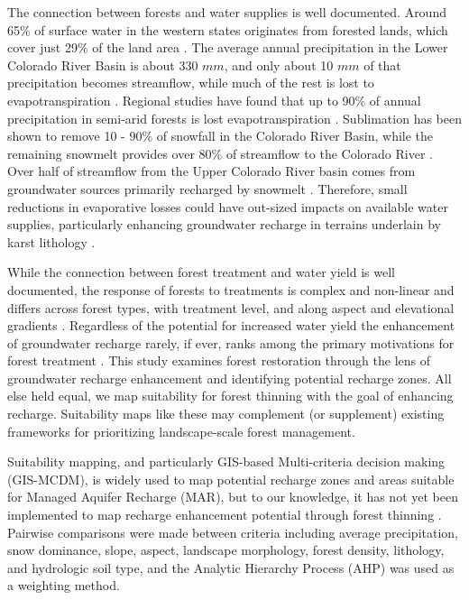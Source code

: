 \documentclass[
  number]{elsarticle}
\begin{document}
The connection between forests and water supplies is well documented.
Around 65\% of surface water in the western states originates from
forested lands, which cover just 29\% of the land area
\citep{brown_source_2005}. The average annual precipitation in the Lower
Colorado River Basin is about 330 \(mm\), and only about 10 \(mm\) of
that precipitation becomes streamflow, while much of the rest is lost to
evapotranspiration \citep{zou_streamflow_2010}. Regional studies have
found that up to 90\% of annual precipitation in semi-arid forests is
lost evapotranspiration
\citep{dore_recovery_2012, ha_evapotranspiration_2015, yaseef_ecohydrology_2010, hibbert1979}.
Sublimation has been shown to remove 10 - 90\% of snowfall in the
Colorado River Basin, while the remaining snowmelt provides over 80\% of
streamflow to the Colorado River \citep{lundquist_sublimation_2024}.
Over half of streamflow from the Upper Colorado River basin comes from
groundwater sources primarily recharged by snowmelt \citep{miller2016}.
Therefore, small reductions in evaporative losses could have out-sized
impacts on available water supplies, particularly enhancing groundwater
recharge in terrains underlain by karst lithology
\citep{hibbert1979, wyatt2013}.

While the connection between forest treatment and water yield is well
documented, the response of forests to treatments is complex and
non-linear and differs across forest types, with treatment level, and
along aspect and elevational gradients
\citep{del_campo_global_2022, biederman_streamflow_2022, zou_streamflow_2010, hibbert1979, moore_physical_2005}.
Regardless of the potential for increased water yield the enhancement of
groundwater recharge rarely, if ever, ranks among the primary
motivations for forest treatment
\citep{stanturf2014, filoso2017, allen_ecological_2002, friederici2013}.
This study examines forest restoration through the lens of groundwater
recharge enhancement and identifying potential recharge zones. All else
held equal, we map suitability for forest thinning with the goal of
enhancing recharge. Suitability maps like these may complement (or
supplement) existing frameworks for prioritizing landscape-scale forest
management.

Suitability mapping, and particularly GIS-based Multi-criteria decision
making (GIS-MCDM), is widely used to map potential recharge zones and
areas suitable for Managed Aquifer Recharge (MAR), but to our knowledge,
it has not yet been implemented to map recharge enhancement potential
through forest thinning \citep{fathi2021, rajashekar2023}. Pairwise
comparisons were made between criteria including average precipitation,
snow dominance, slope, aspect, landscape morphology, forest density,
lithology, and hydrologic soil type, and the Analytic Hierarchy Process
(AHP) was used as a weighting method.
\end{document}
